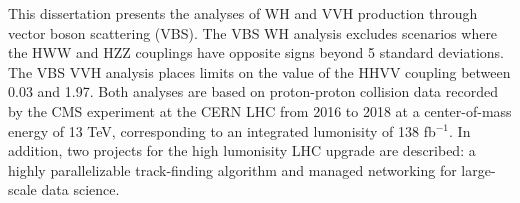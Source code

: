 \begin{dissertationabstract}
    This dissertation presents the analyses of WH and VVH production through vector boson scattering (VBS). 
    The VBS WH analysis excludes scenarios where the HWW and HZZ couplings have opposite signs beyond 5 standard deviations. 
    The VBS VVH analysis places limits on the value of the HHVV coupling between 0.03 and 1.97. 
    Both analyses are based on proton-proton collision data recorded by the CMS experiment at the CERN LHC from 2016 to 2018 at a center-of-mass energy of 13 TeV, corresponding to an integrated lumonisity of 138 fb$^{-1}$. 
    In addition, two projects for the high lumonisity LHC upgrade are described: a highly parallelizable track-finding algorithm and managed networking for large-scale data science. 
\end{dissertationabstract}
